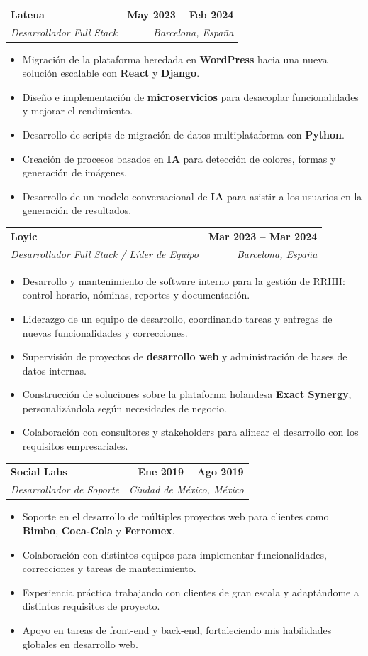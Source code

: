 \documentclass[letterpaper,11pt]{article}
\makeatletter
\newcommand{\resumeItem}[1]{
  \item\small{
    {#1 \vspace{-2pt}}
  }
}
\newcommand{\resumeSubheading}[4]{
  \vspace{-2pt}\item
    \begin{tabular*}{1.0\textwidth}[t]{l@{\extracolsep{\fill}}r}
      \textbf{#1} & \textbf{\small #2} \\
      \textit{\small#3} & \textit{\small #4} \\
    \end{tabular*}\vspace{-7pt}
}
\newcommand{\resumeItemListStart}{\begin{itemize}}
\newcommand{\resumeItemListEnd}{\end{itemize}\vspace{-5pt}}
\makeatother
\begin{document}
    \resumeSubheading
      {Lateua}{May 2023 -- Feb 2024}
      {Desarrollador Full Stack}{Barcelona, España}
      \resumeItemListStart
        \resumeItem{Migración de la plataforma heredada en \textbf{WordPress} hacia una nueva solución escalable con \textbf{React} y \textbf{Django}.}
        \resumeItem{Diseño e implementación de \textbf{microservicios} para desacoplar funcionalidades y mejorar el rendimiento.}
        \resumeItem{Desarrollo de scripts de migración de datos multiplataforma con \textbf{Python}.}
        \resumeItem{Creación de procesos basados en \textbf{IA} para detección de colores, formas y generación de imágenes.}
        \resumeItem{Desarrollo de un modelo conversacional de \textbf{IA} para asistir a los usuarios en la generación de resultados.}
      \resumeItemListEnd
    \vspace{8pt}

    \resumeSubheading
      {Loyic}{Mar 2023 -- Mar 2024}
      {Desarrollador Full Stack / Líder de Equipo}{Barcelona, España}
      \resumeItemListStart
        \resumeItem{Desarrollo y mantenimiento de software interno para la gestión de RRHH: control horario, nóminas, reportes y documentación.}
        \resumeItem{Liderazgo de un equipo de desarrollo, coordinando tareas y entregas de nuevas funcionalidades y correcciones.}
        \resumeItem{Supervisión de proyectos de \textbf{desarrollo web} y administración de bases de datos internas.}
        \resumeItem{Construcción de soluciones sobre la plataforma holandesa \textbf{Exact Synergy}, personalizándola según necesidades de negocio.}
        \resumeItem{Colaboración con consultores y stakeholders para alinear el desarrollo con los requisitos empresariales.}
      \resumeItemListEnd
    \vspace{8pt}

    \resumeSubheading
      {Social Labs}{Ene 2019 -- Ago 2019}
      {Desarrollador de Soporte}{Ciudad de México, México}
      \resumeItemListStart
        \resumeItem{Soporte en el desarrollo de múltiples proyectos web para clientes como \textbf{Bimbo}, \textbf{Coca-Cola} y \textbf{Ferromex}.}
        \resumeItem{Colaboración con distintos equipos para implementar funcionalidades, correcciones y tareas de mantenimiento.}
        \resumeItem{Experiencia práctica trabajando con clientes de gran escala y adaptándome a distintos requisitos de proyecto.}
        \resumeItem{Apoyo en tareas de front-end y back-end, fortaleciendo mis habilidades globales en desarrollo web.}
      \resumeItemListEnd
    \vspace{8pt}
    
\end{document}
